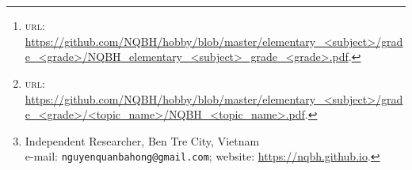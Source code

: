 \documentclass{article}
\title{}
\author{Nguyễn Quản Bá Hồng\footnote{Independent Researcher, Ben Tre City, Vietnam\\e-mail: \texttt{nguyenquanbahong@gmail.com}; website: \url{https://nqbh.github.io}.}}
\date{\today}
\numberwithin{equation}
\begin{document}
\maketitle
\begin{abstract}
	\textsc{[en]} This text is a collection of problems, from easy to advanced, about \textit{<topic>}. This text is also a supplementary material for my lecture note on Elementary <Subject> grade <grade>, which is stored \& downloadable at the following link: \href{https://github.com/NQBH/hobby/blob/master/elementary_<subject>/grade_<grade>/NQBH_elementary_<subject>_grade_<grade>.pdf}{GitHub\texttt{/}NQBH\texttt{/}hobby\texttt{/}elementary <subject>\texttt{/}grade <grade>\texttt{/}lecture}\footnote{\textsc{url}: \url{https://github.com/NQBH/hobby/blob/master/elementary_<subject>/grade_<grade>/NQBH_elementary_<subject>_grade_<grade>.pdf}.}. The latest version of this text has been stored \& downloadable at the following link: \href{https://github.com/NQBH/hobby/blob/master/elementary_<subject>/grade_<grade>/<topic_name>/NQBH_<topic_name>.pdf}{GitHub\texttt{/}NQBH\texttt{/}hobby\texttt{/}elementary <subject>\texttt{/}grade <grade>\texttt{/}<topic>}\footnote{\textsc{url}: \url{https://github.com/NQBH/hobby/blob/master/elementary_<subject>/grade_<grade>/<topic_name>/NQBH_<topic_name>.pdf}.}.
	\vspace{2mm}
	
	\textsc{[vi]} Tài liệu này là 1 bộ sưu tập các bài tập chọn lọc từ cơ bản đến nâng cao về \textit{<topic vi>}. Tài liệu này là phần bài tập bổ sung cho tài liệu chính -- bài giảng \href{https://github.com/NQBH/hobby/blob/master/elementary_<subject>/grade_<grade>/NQBH_elementary_<subject>_grade_<grade>.pdf}{GitHub\texttt{/}NQBH\texttt{/}hobby\texttt{/}elementary <subject>\texttt{/}grade <grade>\texttt{/}lecture} của tác giả viết cho <Subject> Sơ Cấp lớp <grade>. Phiên bản mới nhất của tài liệu này được lưu trữ \& có thể tải xuống ở link sau: \href{https://github.com/NQBH/hobby/blob/master/elementary_<subject>/grade_<grade>/<topic_name>/NQBH_<topic_name>.pdf}{GitHub\texttt{/}NQBH\texttt{/}hobby\texttt{/}elementary <subject>\texttt{/}grade <grade>\texttt{/}<topic>}.
	
	\textsf{\textbf{Nội dung.} }
\end{abstract}
\tableofcontents
\newpage


\section{}


\printbibliography[heading=bibintoc]
	
\end{document}
